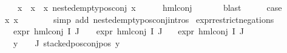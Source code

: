 \begin{isabellebody}
\ \ \ \ {\isachardoublequoteopen}{\isasymforall}x\ {\isasymin}\ x{}\ {\isacharbackquote}{\kern0pt}\ x{}{\isachardot}{\kern0pt}\ nested{\isacharunderscore}{\kern0pt}empty{\isacharunderscore}{\kern0pt}pos{\isacharunderscore}{\kern0pt}conj\ x{\isachardoublequoteclose}\isanewline
\ \ \ \ \isamarkupfalse%
\ hml{\isacharunderscore}{\kern0pt}conj{\isacharparenleft}{\kern0pt}{}{\isacharcomma}{\kern0pt}\ {}{\isacharparenright}{\kern0pt}\isanewline
\ \ \ \ \isamarkupfalse%
\ blast{\isacharplus}{\kern0pt}\isanewline
\ \ \isamarkupfalse%
\ \isamarkupfalse%
\ {\isacharquery}{\kern0pt}case\ \isamarkupfalse%
\ {\isacartoucheopen}x{}{\isacharbackquote}{\kern0pt}\ x{}\ {\isacharequal}{\kern0pt}\ {\isacharbraceleft}{\kern0pt}{\isacharbraceright}{\kern0pt}{\isacartoucheclose}\isanewline
\ \ \ \ \isamarkupfalse%
\ {\isacharparenleft}{\kern0pt}simp\ add{\isacharcolon}{\kern0pt}\ nested{\isacharunderscore}{\kern0pt}empty{\isacharunderscore}{\kern0pt}pos{\isacharunderscore}{\kern0pt}conj{\isachardot}{\kern0pt}intros{\isacharparenleft}{\kern0pt}{}{\isacharparenright}{\kern0pt}{\isacharparenright}{\kern0pt}\isanewline
{}\isamarkupfalse%
%
\endisatagproof
{\isafoldproof}%
%
\isadelimproof
\isanewline
%
\endisadelimproof
\isanewline
{}\isamarkupfalse%
\ expr{\isacharunderscore}{\kern0pt}{}{\isacharunderscore}{\kern0pt}restrict{\isacharunderscore}{\kern0pt}negations{\isacharcolon}{\kern0pt}\ \isanewline
\ \ \ {\isachardoublequoteopen}expr{\isacharunderscore}{\kern0pt}{}\ {\isacharparenleft}{\kern0pt}hml{\isacharunderscore}{\kern0pt}conj\ I\ J\ {\isasymPhi}{\isacharparenright}{\kern0pt}\ {\isasymle}\ {}{\isachardoublequoteclose}\ {\isachardoublequoteopen}expr{\isacharunderscore}{\kern0pt}{}\ {\isacharparenleft}{\kern0pt}hml{\isacharunderscore}{\kern0pt}conj\ I\ J\ {\isasymPhi}{\isacharparenright}{\kern0pt}\ {\isasymle}\ {}{\isachardoublequoteclose}\isanewline
{\isachardoublequoteopen}expr{\isacharunderscore}{\kern0pt}{}\ {\isacharparenleft}{\kern0pt}hml{\isacharunderscore}{\kern0pt}conj\ I\ J\ {\isasymPhi}{\isacharparenright}{\kern0pt}\ {\isasymle}\ {}{\isachardoublequoteclose}\isanewline
\ \ \ {\isachardoublequoteopen}{\isacharparenleft}{\kern0pt}{\isasymforall}y\ {\isasymin}\ {\isacharparenleft}{\kern0pt}{\isasymPhi}\ {\isacharbackquote}{\kern0pt}\ J{\isacharparenright}{\kern0pt}{\isachardot}{\kern0pt}\ stacked{\isacharunderscore}{\kern0pt}pos{\isacharunderscore}{\kern0pt}conj{\isacharunderscore}{\kern0pt}pos\ y{\isacharparenright}{\kern0pt}{\isachardoublequoteclose}\isanewline

\end{isabellebody}
